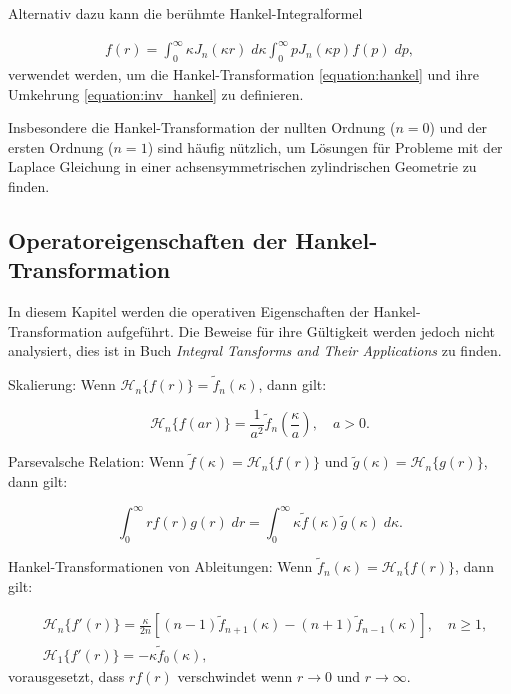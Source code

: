 Alternativ dazu kann die berühmte Hankel-Integralformel 

\begin{align*}
	f(r) = \int_{0}^{\infty}\kappa J_n(\kappa r) \; d\kappa \int_{0}^{\infty} p J_n(\kappa p)f(p) \; dp,
	\label{equation:hankel_integral_formula}
\end{align*}
verwendet werden, um die Hankel-Transformation \eqref{equation:hankel} und ihre Umkehrung \eqref{equation:inv_hankel} zu definieren.

Insbesondere die Hankel-Transformation der nullten Ordnung ($n=0$) und der ersten Ordnung ($n=1$) sind häufig nützlich, um Lösungen für Probleme mit der Laplace Gleichung in einer achsensymmetrischen zylindrischen Geometrie zu finden.

\subsection{Operatoreigenschaften der Hankel-Transformation \label{sub:op_properties_hankel}}
In diesem Kapitel werden die operativen Eigenschaften der Hankel-Transformation aufgeführt. Die Beweise für ihre Gültigkeit werden jedoch nicht analysiert, dies ist in Buch \textit{Integral Tansforms and Their Applications} \cite{lokenath_debnath_integral_2015} zu finden.

\begin{satz}{Skalierung:}
	Wenn $\mathscr{H}_n\{f(r)\}=\tilde{f}_n(\kappa)$, dann gilt:
	
	\begin{equation*}
		\mathscr{H}_n\{f(ar)\}=\frac{1}{a^{2}}\tilde{f}_n \left(\frac{\kappa}{a}\right), \quad a>0.
	\end{equation*}
\end{satz}

\begin{satz}{Parsevalsche Relation:}
Wenn $\tilde{f}(\kappa)=\mathscr{H}_n\{f(r)\}$ und $\tilde{g}(\kappa)=\mathscr{H}_n\{g(r)\}$, dann gilt:

\begin{equation*}
	\int_{0}^{\infty}rf(r)g(r) \; dr = \int_{0}^{\infty}\kappa\tilde{f}(\kappa)\tilde{g}(\kappa) \; d\kappa.
\end{equation*}
\end{satz}

\begin{satz}{Hankel-Transformationen von Ableitungen:}
Wenn $\tilde{f}_n(\kappa)=\mathscr{H}_n\{f(r)\}$, dann gilt:

\begin{align*}
	&\mathscr{H}_n\{f'(r)\}=\frac{\kappa}{2n}\left[(n-1)\tilde{f}_{n+1}(\kappa)-(n+1)\tilde{f}_{n-1}(\kappa)\right], \quad n\geq1, \\
	&\mathscr{H}_1\{f'(r)\}=-\kappa \tilde{f}_0(\kappa),
\end{align*}
vorausgesetzt, dass $rf(r)$ verschwindet wenn $r\to0$ und $r\to\infty$.
\end{satz}

